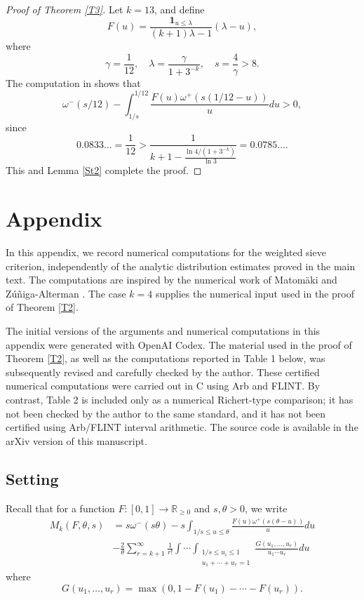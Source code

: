\documentclass{amsart}
\theoremstyle{definition}
\theoremstyle{remark}
\newcommand{\1}{
    \bm{1}
}
\begin{document}
\begin{proof}[Proof of Theorem \ref{T3}]

Let $k=13$, and define
\[ F(u) = \frac{\1_{u \leq \lambda} }{(k+1)\lambda - 1} \left( \lambda - u \right), \]
where
\[ \gamma = \frac{1}{12}, \quad \lambda = \frac{\gamma}{1+3^{-k}}, \quad s = \frac{4}{\gamma}>8. \]
The computation in \cite[Section 6]{heath2002lectures} shows that
\[ \omega^{-}(s/12) - \int_{1/s}^{1/12} \frac{F(u) \omega^{+}(s(1/12-u))}{u} du > 0, \]
since
\[ 0.0833 \ldots = \frac{1}{12} > \frac{1}{k+1 - \frac{\ln{4/(1+3^{-k})}}{\ln{3}}} = 0.0785\ldots. \]
This and Lemma \ref{St2} complete the proof. 
\end{proof}





\section{Appendix}


In this appendix, we record numerical computations for the weighted sieve criterion, independently of the analytic distribution estimates proved in the main text. The computations are inspired by the numerical work of Matom{\"a}ki and Z{\'u}{\~n}iga-Alterman \cite{matomaki2025weighted}. 
The case \(k=4\) supplies the numerical input used in the proof of Theorem \ref{T2}. 

The initial versions of the arguments and numerical computations in this appendix were generated with OpenAI Codex. The material used in the proof of Theorem \ref{T2}, as well as the computations reported in Table 1 below, was subsequently revised and carefully checked by the author. These certified numerical computations were carried out in C using Arb and FLINT. By contrast, Table 2 is included only as a numerical Richert-type comparison; it has not been checked by the author to the same standard, and it has not been certified using Arb/FLINT interval arithmetic. The source code is available in the arXiv version of this manuscript.


\subsection{Setting}

Recall that for a function $F:[0,1] \to \mathbb{R}_{\geq 0}$ and $s,\theta>0$, we write
\begin{align*}
M_k(F,\theta,s) &= s \omega^-(s\theta) - s \int_{1/s \leq u \leq \theta} \frac{F(u) \omega^+(s(\theta-u))}{u} du \\
& - \frac{2}{\theta} \sum_{r=k+1}^{\infty} \frac{1}{r!} \int \cdots \int_{\substack{1/s \leq u_i \leq 1 \\ u_1 + \cdots + u_r = 1}} \frac{G(u_1, \ldots, u_r)}{u_1 \cdots u_r} du
\end{align*}
where
\[ G(u_1,\ldots,u_r) = \max(0,1-F(u_1)-\cdots-F(u_r)). \]
\end{document}
